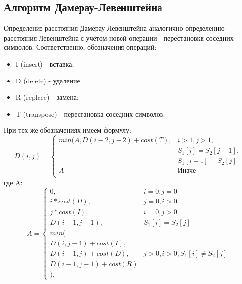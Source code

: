 \subsection{Алгоритм Дамерау-Левенштейна}
Определение расстояния Дамерау-Левенштейна аналогично определению расстояния Левенштейна с учётом новой операции - перестановки соседних символов. Соответственно, обозначения операций:
\begin{itemize}
    \item I (insert) - вставка;
    \item D (delete) - удаление;
    \item R (replace) - замена;
    \item T (transpose) - перестановка соседних символов.
\end{itemize}

При тех же обозначениях имеем формулу:
\begin{displaymath}
D(i,j) = \left\{ \begin{array}{ll}
 min(A, D(i - 2, j - 2) + cost(T), & \textrm{$i > 1, j > 1,$}\\
 & \textrm{$S_1[i] = S_2[j - 1],$}\\
 & \textrm{$S_1[i - 1] = S_2[j]$}\\
 A & \textrm{Иначе}\\
  \end{array} \right.
\end{displaymath}
где A:
\begin{displaymath}
A = \left\{ \begin{array}{ll}
 0, & \textrm{$i = 0, j = 0$}\\
 i * cost(D), & \textrm{$j = 0, i > 0$}\\
 j * cost(I), & \textrm{$i = 0, j > 0$}\\
 D(i - 1, j - 1), & \textrm{$S_{1}[i] = S_{2}[j]$}\\
min(\\
D(i,j-1) + cost(I),\\
D(i-1, j) + cost(D), &\textrm{$j > 0, i > 0, S_1[i] \neq S_2[j]$}\\
D(i-1, j-1) + cost(R)\\
),
  \end{array} \right.
\end{displaymath}

